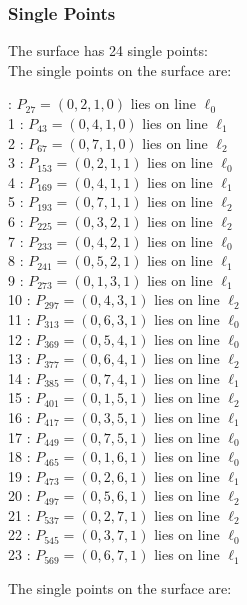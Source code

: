 \documentclass{article}
\begin{document}
{\subsubsection*{Single Points}
The surface has 24 single points:\\
The single points on the surface are:\\
\begin{multicols}{2}
 : $P_{27}=( 0, 2, 1, 0 )$ lies on line $\ell_{0}$\\
1 : $P_{43}=( 0, 4, 1, 0 )$ lies on line $\ell_{1}$\\
2 : $P_{67}=( 0, 7, 1, 0 )$ lies on line $\ell_{2}$\\
3 : $P_{153}=( 0, 2, 1, 1 )$ lies on line $\ell_{0}$\\
4 : $P_{169}=( 0, 4, 1, 1 )$ lies on line $\ell_{1}$\\
5 : $P_{193}=( 0, 7, 1, 1 )$ lies on line $\ell_{2}$\\
6 : $P_{225}=( 0, 3, 2, 1 )$ lies on line $\ell_{2}$\\
7 : $P_{233}=( 0, 4, 2, 1 )$ lies on line $\ell_{0}$\\
8 : $P_{241}=( 0, 5, 2, 1 )$ lies on line $\ell_{1}$\\
9 : $P_{273}=( 0, 1, 3, 1 )$ lies on line $\ell_{1}$\\
10 : $P_{297}=( 0, 4, 3, 1 )$ lies on line $\ell_{2}$\\
11 : $P_{313}=( 0, 6, 3, 1 )$ lies on line $\ell_{0}$\\
12 : $P_{369}=( 0, 5, 4, 1 )$ lies on line $\ell_{0}$\\
13 : $P_{377}=( 0, 6, 4, 1 )$ lies on line $\ell_{2}$\\
14 : $P_{385}=( 0, 7, 4, 1 )$ lies on line $\ell_{1}$\\
15 : $P_{401}=( 0, 1, 5, 1 )$ lies on line $\ell_{2}$\\
16 : $P_{417}=( 0, 3, 5, 1 )$ lies on line $\ell_{1}$\\
17 : $P_{449}=( 0, 7, 5, 1 )$ lies on line $\ell_{0}$\\
18 : $P_{465}=( 0, 1, 6, 1 )$ lies on line $\ell_{0}$\\
19 : $P_{473}=( 0, 2, 6, 1 )$ lies on line $\ell_{1}$\\
20 : $P_{497}=( 0, 5, 6, 1 )$ lies on line $\ell_{2}$\\
21 : $P_{537}=( 0, 2, 7, 1 )$ lies on line $\ell_{2}$\\
22 : $P_{545}=( 0, 3, 7, 1 )$ lies on line $\ell_{0}$\\
23 : $P_{569}=( 0, 6, 7, 1 )$ lies on line $\ell_{1}$\\
\end{multicols}
The single points on the surface are:\\
}
\end{document}
